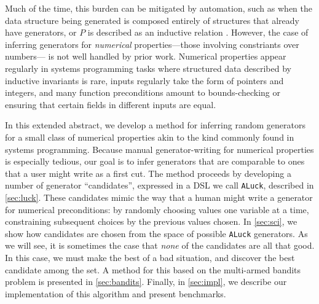 \documentclass[sigconf,nonacm]{acmart}
\begin{document}
Much of the time, this burden can be mitigated by automation, such as when the data structure being generated
is composed entirely of structures that already have generators, or $P$ is described as an inductive
relation \cite{gggir}. However, the case of inferring generators for \emph{numerical} properties---those involving constriants over numbers--- is not well
handled by prior work. Numerical properties appear regularly in
systems programming tasks \cite{ironfleet} where structured data described by inductive invariants is rare, inputs regularly
take the form of pointers and integers, and many function preconditions amount to bounds-checking or ensuring
that certain fields in different inputs are equal.

In this extended abstract, we develop a method for inferring random generators for a small class of numerical properties akin
to the kind commonly found in systems programming. Because manual generator-writing for numerical properties is especially
tedious, our goal is to infer generators that are comparable to ones that a user might write as a first cut.
The method proceeds by developing a number of generator ``candidates'', expressed in a DSL we call \texttt{ALuck}, described in \autoref{sec:luck}.
These candidates mimic the way that a human might write a generator for numerical preconditions: by randomly choosing values
one variable at a time, constraining subsequent choices by the previous values chosen. In \autoref{sec:sci}, we show how candidates
are chosen from the space of possible \texttt{ALuck} generators.
As we will see, it is sometimes the case that \emph{none} of the candidates are all that good. In this case, we must make the best
of a bad situation, and discover the best candidate among the set. A method for this based on the multi-armed bandits problem \cite{banditbook} is presented in \autoref{sec:bandits}.
Finally, in \autoref{sec:impl}, we describe our implementation of
this algorithm and present benchmarks.


\end{document}
